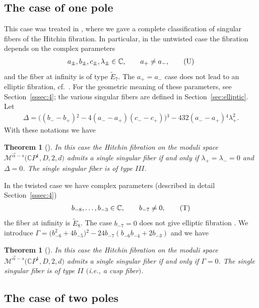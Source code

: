 \documentclass[10pt,a4paper]{amsart}
\newcommand{\C}{{\mathbb C}} %
\newcommand{\CP}[1]{\mathbb{C}P^{#1}} %
\newcommand{\Et}[1]{\widetilde{E}_{#1}} %
\newcommand{\Mod}{{\mathcal M}} %
\numberwithin{equation}{section}
\newtheorem{thm}[prop]{Theorem}
\begin{document}
\subsection{The case of one pole}\label{ss:OnePole}
This case was treated in \cite{ISS}, where we gave a complete
classification of singular fibers of the Hitchin fibration.
In particular, in the untwisted case the fibration depends on
the complex parameters
\begin{gather}\label{eq:untwisted-parameters}
 a_{\pm}, b_{\pm}, c_{\pm}, \lambda_{\pm} \in \C ,\qquad a_+ \neq a_- ,\tag{{U}}
 \end{gather}
and the fiber at infinity is of type $\Et7$. {The $a_+ = a_-$ case does
not lead to an elliptic fibration, cf.~\cite[Lemma~5.6]{ISS2}.}
For the geometric meaning of these parameters, see Section~\ref{sssec:4};
the various singular fibers are defined in Section~\ref{sec:elliptic}.
Let
\begin{gather*} \Delta = \big((b_--b_+){}^2-4 (a_--a_+) (c_--c_+)\big){}^3-432 (a_--a_+){}^4 \lambda _+^2.\end{gather*}
With these notations we have
\begin{thm}[{\cite[Theorem~1.1]{ISS}}]\label{thm:OnePoleUntwisted}
In this case the Hitchin fibration on the moduli space $\Mod ^{\vec{\alpha}-s}{\big(\CP1, D, 2, d\big)}$ admits a single singular fiber if
and only if $\lambda _+=\lambda _-=0$ and $\Delta =0$. The single singular fiber is of type $III$.
\end{thm}

In the twisted case we have complex parameters (described in detail Section~\ref{sssec:4})
\begin{gather}\label{eq:twisted-parameters}
 b_{-8},\ldots ,b_{-3} \in \C ,\qquad b_{-7} \neq 0, \tag{{T}}
 \end{gather}
the fiber at infinity is $\Et8$. The case $b_{-7} = 0$ does not give elliptic fibration \cite[Section~2.3.2]{ISS}.
We introduce
${\Gamma}=\big(b_{-6}^2+4 b_{-5}\big){}^2-24 b_{-7} (b_{-6} b_{-4}+2 b_{-3})$ and we have
\begin{thm}[{\cite[Theorem~1.3]{ISS}}]\label{thm:OnePoleTwisted}
In this case the Hitchin fibration on the moduli space $\Mod
^{\vec{\alpha}-s}{\big(\CP1, D, 2, d\big)}$ admits a single singular fiber
if and only if ${\Gamma} =0$. The single singular fiber is of
type $II$ $($i.e., a cusp fiber$)$.
\end{thm}

\subsection{The case of two poles}\label{ss:TwoPoles}
\end{document}
